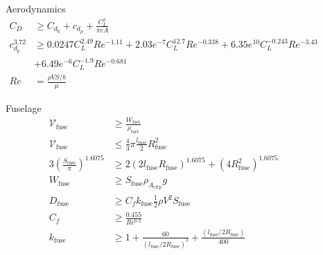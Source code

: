 \documentclass{beamer}
\begin{document}
\begin{frame}
\begin{columns}
\begin{itemize}
{{    \item Aerodynamics
        \begin{align*}
            C_D &\geq C_{d_0} + c_{d_p} + \frac{C_L^2}{\pi e A} \\
        c_{d_p}^{3.72} &\geq 0.0247C_L^{2.49}Re^{-1.11} + 2.03e^{-7}C_L^{12.7}Re^{-0.338} + 6.35e^{10}C_L^{-0.243}Re^{-3.43} \nonumber \\
                       &+ 6.49e^{-6}C_L^{-1.9}Re^{-0.681} \\
        Re &= \frac{\rho V S/b}{\mu}
        \end{align*}

    \item Fuselage
        \begin{align*}
            \mathcal{V}_{\text{fuse}} &\geq \frac{W_{\text{fuel}}}{\rho_{\text{fuel}}} \\
            \mathcal{V}_{\text{fuse}} & \leq \frac{4}{3}\pi \frac{l_{\text{fuse}}}{2}R_{\text{fuse}}^2 \\
            3 \left( \frac{S_{\text{fuse}}}{\pi} \right)^{1.6075} &\geq 2(2l_{\text{fuse}}R_{\text{fuse}})^{1.6075} + (4R_{\text{fuse}}^2)^{1.6075} \\
            W_{\text{fuse}} &\geq S_{\text{fuse}} \rho_{A_{\text{cfrp}}} g \\
        D_{\text{fuse}} &\geq C_f k_{\text{fuse}} \frac{1}{2} \rho V^2 S_{\text{fuse}} \\
        C_f &\geq \frac{0.455}{Re^{0.3}}\\
            k_{\text{fuse}} &\geq 1 + \frac{60}{(l_{\text{fuse}}/2R_{\text{fuse}})^3} + \frac{(l_{\text{fuse}}/2R_{\text{fuse}})}{400}
        \end{align*}


}}
    \end{itemize}
    

\end{columns}
\end{frame}
\end{document}
